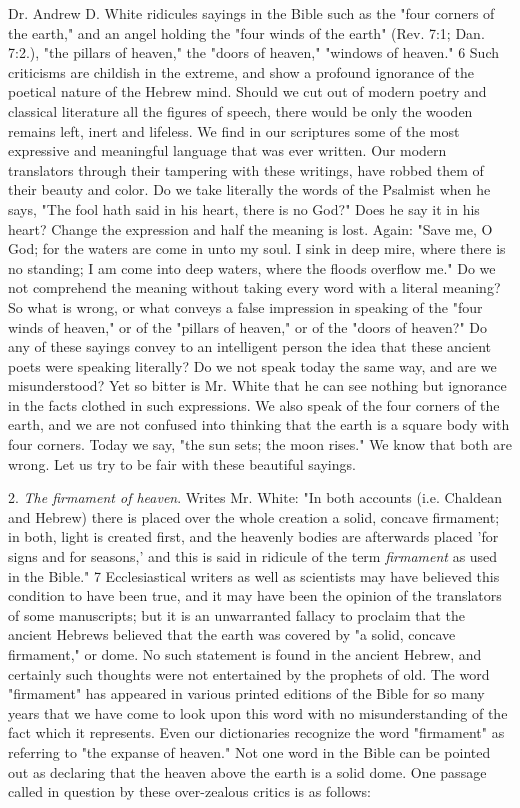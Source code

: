 Dr. Andrew D. White ridicules sayings in the Bible such as the "four corners of the earth,"
and an angel holding the "four winds of the earth" (Rev. 7:1; Dan. 7:2.), "the pillars of
heaven," the "doors of heaven," "windows of heaven." 6 Such criticisms are childish in the
extreme, and show a profound ignorance of the poetical nature of the Hebrew mind. Should
we cut out of modern poetry and classical literature all the figures of speech, there would be
only the wooden remains left, inert and lifeless. We find in our scriptures some of the most
expressive and meaningful language that was ever written. Our modern translators through
their tampering with these writings, have robbed them of their beauty and color. Do we take
literally the words of the Psalmist when he says, "The fool hath said in his heart, there is no
God?" Does he say it in his heart? Change the expression and half the meaning is lost. Again:
"Save me, O God; for the waters are come in unto my soul. I sink in deep mire, where there
is no standing; I am come into deep waters, where the floods overflow me." Do we not
comprehend the meaning without taking every word with a literal meaning? So what is
wrong, or what conveys a false impression in speaking of the "four winds of heaven," or of
the "pillars of heaven," or of the "doors of heaven?" Do any of these sayings convey to an
intelligent person the idea that these ancient poets were speaking literally? Do we not speak
today the same way, and are we misunderstood? Yet so bitter is Mr. White that he can see
nothing but ignorance in the facts clothed in such expressions. We also speak of the four
corners of the earth, and we are not confused into thinking that the earth is a square body
with four corners. Today we say, "the sun sets; the moon rises." We know that both are
wrong. Let us try to be fair with these beautiful sayings.

2. \textit{The firmament of heaven}. Writes Mr. White: "In both accounts (i.e. Chaldean and Hebrew)
there is placed over the whole creation a solid, concave firmament; in both, light is created
first, and the heavenly bodies are afterwards placed 'for signs and for seasons,' and this is said
in ridicule of the term \textit{firmament} as used in the Bible." 7 Ecclesiastical writers as well as
scientists may have believed this condition to have been true, and it may have been the
opinion of the translators of some manuscripts; but it is an unwarranted fallacy to proclaim
that the ancient Hebrews believed that the earth was covered by "a solid, concave
firmament," or dome. No such statement is found in the ancient Hebrew, and certainly such
thoughts were not entertained by the prophets of old. The word "firmament" has appeared in
various printed editions of the Bible for so many years that we have come to look upon this
word with no misunderstanding of the fact which it represents. Even our dictionaries
recognize the word "firmament" as referring to "the expanse of heaven." Not one word in the
Bible can be pointed out as declaring that the heaven above the earth is a solid dome. One
passage called in question by these over-zealous critics is as follows:

